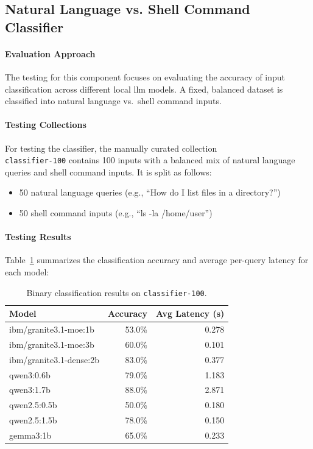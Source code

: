
\subsection{Natural Language vs. Shell Command Classifier}

\paragraph{Evaluation Approach}{}
The testing for this component focuses on evaluating the accuracy of input
classification across different local \gls{llm} models. A fixed, balanced dataset
is classified into natural language vs.\ shell command inputs.

\paragraph{Testing Collections}{}
For testing the classifier, the manually curated collection\\
\texttt{classifier-100} contains 100 inputs with a balanced mix of natural
language queries and shell command inputs. It is split as follows:
\begin{itemize}
  \item 50 natural language queries (e.g., ``How do I list files in a
    directory?'')
  \item 50 shell command inputs (e.g., ``ls -la /home/user'')
\end{itemize}

\paragraph{Testing Results}{}
Table~\ref{tab:eval-classifier-results} summarizes the classification accuracy
and average per-query latency for each model:

\begin{table}[h]
  \centering
  \scriptsize
  \caption{Binary classification results on \texttt{classifier-100}.}
    \begin{tabular}{lrr}
    \toprule
    \textbf{Model} & \textbf{Accuracy} & \textbf{Avg Latency (s)} \\
    \midrule
    ibm/granite3.1-moe:1b & 53.0\% & 0.278 \\
    ibm/granite3.1-moe:3b & 60.0\% & 0.101 \\
    ibm/granite3.1-dense:2b & 83.0\% & 0.377 \\
    qwen3:0.6b & 79.0\% & 1.183 \\
    qwen3:1.7b & 88.0\% & 2.871 \\
    qwen2.5:0.5b & 50.0\% & 0.180 \\
    qwen2.5:1.5b & 78.0\% & 0.150 \\
    gemma3:1b & 65.0\% & 0.233 \\
    \bottomrule
  \end{tabular}\label{tab:eval-classifier-results}
\end{table}

